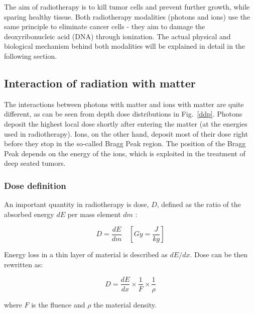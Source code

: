 The aim of radiotherapy is to kill tumor cells and prevent further growth, while sparing healthy tissue. Both radiotherapy modalities (photons and ions) use the same principle to eliminate cancer cells - 
they aim to damage the deoxyribonucleic acid (DNA) through ionization. The actual physical and biological mechanism behind both modalities will be explained in detail in the following section.

\subsection{Interaction of radiation with matter}

The interactions between photons with matter and ions with matter are quite different, as can be seen from depth dose distributions in Fig.~\ref{ddp}. Photons deposit the highest local dose shortly after entering the matter 
(at the energies used in radiotherapy). Ions, on the other hand, deposit most of their dose right before they stop in the so-called Bragg Peak region. The position of the Bragg Peak depends on the energy of the ions, which is exploited in the treatment
of deep seated tumors.

\subsubsection{Dose definition}

An important quantity in radiotherapy is dose, $D$, defined as the ratio of the absorbed energy $dE$ per mass element $dm$ \cite{ICRU1993}:

\begin{equation}
 D = \frac{dE}{dm} \quad \left[ Gy = \frac{J}{kg} \right]
\end{equation}

Energy loss in a thin layer of material is described as $dE/dx$. Dose can be then rewritten as:

\begin{equation}
 D = \frac{dE}{dx} \times \frac{1}{F} \times \frac{1}{\rho}
\end{equation}

where $F$ is the fluence and $\rho$ the material density.


\newpage

